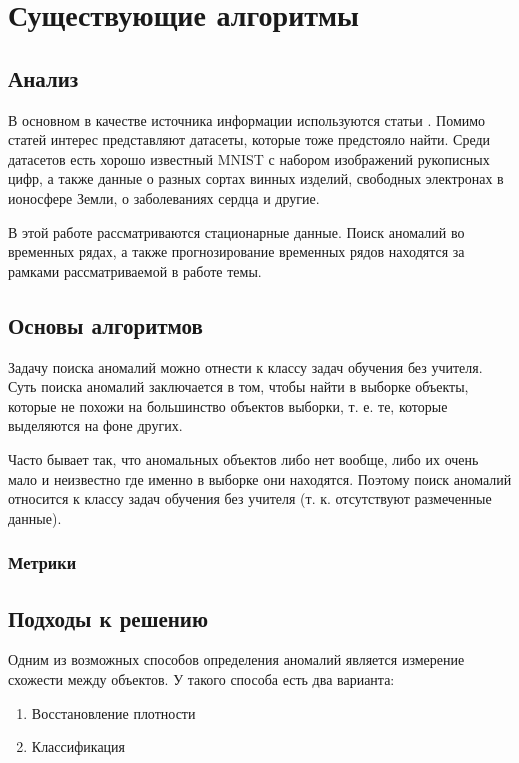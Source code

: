 \chapter{Существующие алгоритмы} \label{ch:ch2}

\section{Анализ} \label{sec:ch2/sec1}

В основном в качестве источника информации используются статьи \cite{dai, hodge, vakili, varun, billor, wilkinson}. Помимо статей интерес представляют датасеты, которые тоже предстояло найти. Среди датасетов есть хорошо известный MNIST с набором изображений рукописных цифр, а также данные о разных сортах винных изделий, свободных электронах в ионосфере Земли, о заболеваниях сердца и другие. \cite{billor}

В этой работе рассматриваются стационарные данные. Поиск аномалий во временных рядах, а также прогнозирование временных рядов находятся за рамками рассматриваемой в работе темы.

\section{Основы алгоритмов} \label{sec:ch2/sec2}

Задачу поиска аномалий можно отнести к классу задач обучения без учителя. Суть поиска аномалий заключается в том, чтобы найти в выборке объекты, которые не похожи на большинство объектов выборки, т. е. те, которые выделяются на фоне других.

Часто бывает так, что аномальных объектов либо нет вообще, либо их очень мало и неизвестно где именно в выборке они находятся. Поэтому поиск аномалий относится к классу задач обучения без учителя (т. к. отсутствуют размеченные данные).

\subsection{Метрики}




\section{Подходы к решению} \label{sec:ch2/sec3}

Одним из возможных способов определения аномалий является измерение схожести между объектов. У такого способа есть два варианта:
\begin{enumerate}
  \item Восстановление плотности
  \item Классификация
\end{enumerate}

